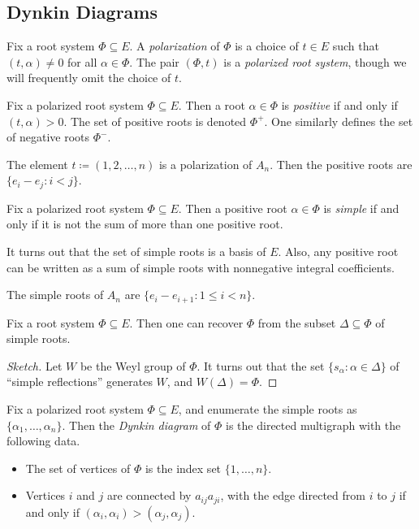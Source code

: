 \documentclass{article}
\begin{document}
\subsection{Dynkin Diagrams} \label{subsec:dynkin}
\begin{definition}[polarization]
	Fix a root system $\Phi\subseteq E$. A \textit{polarization} of $\Phi$ is a choice of $t\in E$ such that $(t,\alpha)\ne0$ for all $\alpha\in\Phi$. The pair $(\Phi,t)$ is a \textit{polarized root system}, though we will frequently omit the choice of $t$.
\end{definition}
\begin{definition}[positive]
	Fix a polarized root system $\Phi\subseteq E$. Then a root $\alpha\in\Phi$ is \textit{positive} if and only if $(t,\alpha)>0$. The set of positive roots is denoted $\Phi^+$. One similarly defines the set of negative roots $\Phi^-$.
\end{definition}
\begin{example}
	The element $t\coloneqq(1,2,\ldots,n)$ is a polarization of $A_n$. Then the positive roots are $\{e_i-e_j:i<j\}$.
\end{example}
\begin{definition}[simple]
	Fix a polarized root system $\Phi\subseteq E$. Then a positive root $\alpha\in\Phi$ is \textit{simple} if and only if it is not the sum of more than one positive root.
\end{definition}
\begin{remark}
	It turns out that the set of simple roots is a basis of $E$. Also, any positive root can be written as a sum of simple roots with nonnegative integral coefficients.
\end{remark}
\begin{example}
	The simple roots of $A_n$ are $\{e_i-e_{i+1}:1\le i<n\}$.
\end{example}
\begin{lemma}
	Fix a root system $\Phi\subseteq E$. Then one can recover $\Phi$ from the subset $\Delta\subseteq\Phi$ of simple roots.
\end{lemma}
\begin{proof}[Sketch]
	Let $W$ be the Weyl group of $\Phi$. It turns out that the set $\{s_\alpha:\alpha\in\Delta\}$ of ``simple reflections'' generates $W$, and $W(\Delta)=\Phi$.
\end{proof}
\begin{definition}
	Fix a polarized root system $\Phi\subseteq E$, and enumerate the simple roots as $\{\alpha_1,\ldots,\alpha_n\}$. Then the \textit{Dynkin diagram} of $\Phi$ is the directed multigraph with the following data.
	\begin{itemize}
		\item The set of vertices of $\Phi$ is the index set $\{1,\ldots,n\}$.
		\item Vertices $i$ and $j$ are connected by $a_{ij}a_{ji}$, with the edge directed from $i$ to $j$ if and only if $(\alpha_i,\alpha_i)>(\alpha_j,\alpha_j)$.
	\end{itemize}
\end{definition}
\end{document}
